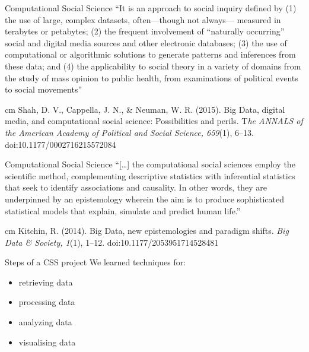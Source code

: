 \documentclass{beamer}
\begin{document}
\begin{frame}{Computational Social Science}
	``It is an approach to social inquiry defined by (1) the use of large, complex datasets, often—though not always— measured in terabytes or petabytes; (2) the frequent involvement of “naturally occurring” social and digital media sources and other electronic databases; (3) the use of computational or algorithmic solutions to generate patterns and inferences from these data; and (4) the applicability to social theory in a variety of domains from the study of mass opinion to public health, from examinations of political events to social movements''
	
	 cm
	\tiny{Shah, D. V., Cappella, J. N., \& Neuman, W. R. (2015). Big Data, digital media, and computational social science: Possibilities and perils. T\textit{he ANNALS of the American Academy of Political and Social Science, 659}(1), 6–13. doi:10.1177/0002716215572084}
\end{frame}





\begin{frame}{Computational Social Science}
``[\ldots] the computational social sciences employ the scientific method, complementing descriptive statistics with inferential statistics that seek to identify associations and causality. In other words, they are underpinned by an epistemology wherein the aim is to produce sophisticated statistical models that explain, simulate and predict human life.''

 cm
\tiny{Kitchin, R. (2014). Big Data, new epistemologies and paradigm shifts. \textit{Big Data \& Society, 1}(1), 1–12. doi:10.1177/2053951714528481}
\end{frame}

%
%
%
%
%




\begin{frame}{Steps of a CSS project}
We learned techniques for:
\begin{itemize}
	\item retrieving data
	\item processing data
	\item analyzing data
	\item visualising data
\end{itemize}

\end{frame}
\end{document}
